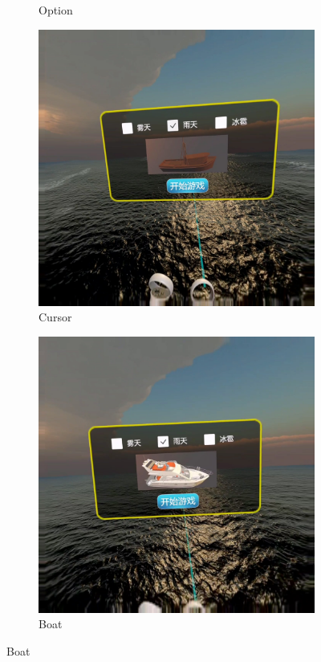 \documentclass[a4paper,10pt]{article}
\begin{document}
\begin{figure}[htbp]
\begin{subfigure}{0.23\textwidth}
				\captionsetup{font=scriptsize}
				\caption{Option}
				\label{fig: Main menu-IP-1}
			\end{subfigure}
			\begin{subfigure}{0.23\textwidth}
				\includegraphics[width=\linewidth]{picture/Main menu-IP-2}
				\captionsetup{font=scriptsize}
				\caption{Cursor}
				\label{fig: Main menu-IP-2}
			\end{subfigure}
			\begin{subfigure}{0.23\textwidth}
				\includegraphics[width=\linewidth]{picture/Main menu-IP-3}
				\captionsetup{font=scriptsize}
				\caption{Boat}
				\label{fig: Main menu-IP-3}
			\end{subfigure}
			

\end{figure}
\end{document}
